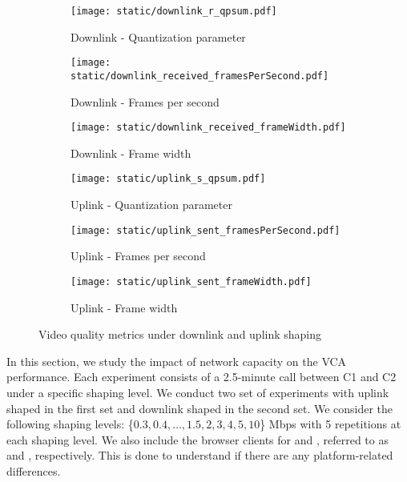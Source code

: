 \begin{figure*}[]
    \begin{subfigure}[t]{0.33\textwidth}      
    		\centering
        \texttt{[image: static/downlink\_r\_qpsum.pdf]}
        \caption{Downlink - Quantization parameter}
 		\label{subfig:downlink_video_qp}
    \end{subfigure}%
    \hfill
	\begin{subfigure}[t]{0.33\textwidth}   
        \centering
        \texttt{[image: static/downlink\_received\_framesPerSecond.pdf]}
    \caption{Downlink - Frames per second}
    \label{subfig:downlink_frames_per_second}
    \end{subfigure}%
    \hfill
	\begin{subfigure}[t]{0.33\textwidth}   
        \centering
        \texttt{[image: static/downlink\_received\_frameWidth.pdf]}
    \caption{Downlink - Frame width}
    \label{subfig:downlink_frame_width}
    \end{subfigure}
    \newline
        \begin{subfigure}[t]{0.33\textwidth}      
    		\centering
        \texttt{[image: static/uplink\_s\_qpsum.pdf]}
        \caption{Uplink - Quantization parameter}
 		\label{subfig:uplink_video_qp}
    \end{subfigure}%
    \hfill
	\begin{subfigure}[t]{0.33\textwidth}   
        \centering
        \texttt{[image: static/uplink\_sent\_framesPerSecond.pdf]}
    \caption{Uplink - Frames per second}
    \label{subfig:uplink_frames_per_second}
    \end{subfigure}%
    \hfill
	\begin{subfigure}[t]{0.33\textwidth}   
        \centering
        \texttt{[image: static/uplink\_sent\_frameWidth.pdf]}
    \caption{Uplink - Frame width}
    \label{subfig:uplink_frame_width}
    \end{subfigure}
	\caption{Video quality metrics under downlink and uplink shaping}
	\label{fig:video_qual}
\end{figure*}



In this section, we study the impact of network capacity on the VCA performance. Each experiment consists of a 2.5-minute call between C1 and C2 under a specific shaping level. We conduct two set of experiments with uplink shaped in the first set and downlink shaped in the second set. We consider the following shaping levels: \{$0.3, 0.4, \dots, 1.5, 2, 3, 4, 5, 10$\} Mbps with 5 repetitions at each shaping level.  We also include the browser clients for \zoom and \teams, referred to as \zoombrowser and \teamsbrowser, respectively. This is done to understand if there are any platform-related differences. 

